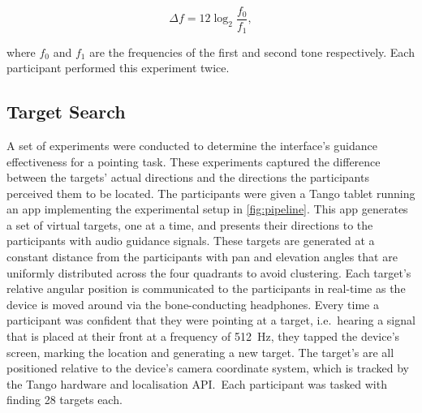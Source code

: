 \documentclass[acmsmall]{acmart}
\begin{document}
\begin{equation}
\label{eq:semitone-difference}
  \Delta f = 12\log_2\frac{f_0}{f_1}, 
\end{equation}

\noindent where $f_0$ and $f_1$ are the frequencies of the first and second tone respectively.
Each participant performed this experiment twice. 

\subsection{Target Search}\label{sec:target_search}

A set of experiments were conducted to determine the interface's guidance effectiveness for a pointing task.
These experiments captured the difference between the targets' actual directions and the directions the participants perceived them to be located. 
The participants were given a Tango tablet running an app implementing the experimental setup in \cref{fig:pipeline}.
This app generates a set of virtual targets, one at a time, and presents their directions to the participants with audio guidance signals.
These targets are generated at a constant distance from the participants with pan and elevation angles that are uniformly distributed across the four quadrants to avoid clustering.
Each target's relative angular position is communicated to the participants in real-time as the device is moved around via the bone-conducting headphones.
Every time a participant was confident that they were pointing at a target, i.e.\ hearing a signal that is placed at their front at a frequency of \SI{512}{\hertz}, they tapped the device's screen, marking the location and generating a new target.
The target's are all positioned relative to the device's camera coordinate system, which is tracked by the Tango hardware and localisation API.\
Each participant was tasked with finding 28 targets each.

\end{document}
